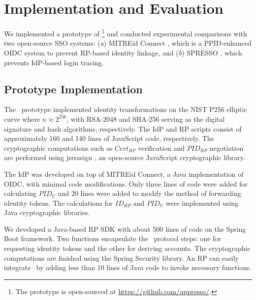\section{Implementation and Evaluation}
\label{sec:implementation}

We implemented a prototype of \usso\footnote{The prototype is open-sourced at \url{https://github.com/uppresso/}.} and conducted experimental comparisons with two open-source SSO systems:
 (\emph{a}) MITREid Connect \cite{MITREid}, which is a PPID-enhanced OIDC system \cite{NIST2017draft} to prevent RP-based identity linkage,
 and (\emph{b}) SPRESSO \cite{SPRESSO}, which prevents IdP-based login tracing.


\subsection{Prototype Implementation}
\label{subsec:proto-imple}

The \usso\ prototype implemented identity transformations on the NIST P256 elliptic curve where $n \approx 2^{256}$, with RSA-2048 and SHA-256 serving as the digital signature and hash algorithms, respectively. The IdP and RP scripts consist of approximately 160 and 140 lines of JavaScript code, respectively.  %
The cryptographic computations such as $Cert_{RP}$ verification and $PID_{RP}$ negotiation are performed using jsrsasign \cite{jsrsasign}, an open-source JavaScript cryptographic library.

The IdP was developed on top of MITREid Connect\cite{MITREid}, a Java implementation of OIDC, %
with minimal code modifications. Only three lines of code were added for calculating $PID_U$ and 20 lines were added to modify the method of forwarding identity tokens.
The calculations for $ID_{RP}$ and $PID_U$ were implemented using Java cryptographic libraries.

We developed a Java-based RP SDK with about 500 lines of code on the Spring Boot framework.
Two functions encapsulate the \usso\ protocol steps: one for requesting identity tokens and the other for deriving accounts. The cryptographic computations are finished using the Spring Security library.
An RP can easily integrate \usso\ by  adding less than 10 lines of Java code to invoke necessary functions.
